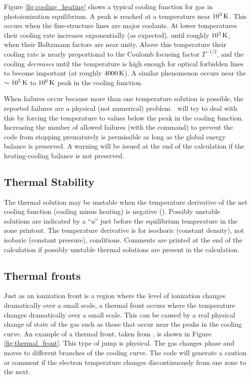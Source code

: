Figure \ref{fig:cooling_heating} shows a typical cooling function for
gas in photoionization equilibrium.
A peak is reached at a temperature near $10^3 {\rm\thinspace K}$.
This occurs
when the fine-structure lines are major coolants.
At lower temperatures
their cooling rate increases exponentially (as expected),
until roughly
$10^3 {\rm\thinspace K}$, when their Boltzmann factors are near unity.
Above this temperature
their cooling rate is nearly proportional to the Coulomb focusing factor
$T^{-1/2}$, and the cooling \emph{decreases} until the temperature
is high enough for
optical forbidden lines to become important (at roughly $4000 {\rm\thinspace K}$).
A similar
phenomenon occurs near the $\sim 10^5 {\rm\thinspace K}$ to $10^6 {\rm\thinspace K}$ peak in
the cooling function.

When failures occur because more than one temperature solution is
possible,  the reported failures are a physical (not numerical) problem.
\Cloudy\ will try to deal with this by forcing the temperature to
values below the peak in the cooling function.
Increasing the number of allowed failures
(with the  command) to prevent the code from
stopping prematurely
is permissible as long as the global energy balance is preserved.
A warning
will be issued at the end of the calculation if the heating-cooling balance
is not preserved.

\subsection{Thermal Stability}

The thermal solution may be unstable when the temperature derivative
of the net cooling function (cooling minus heating) is negative (\citealp{Field1965}).
Possibly unstable solutions are indicated by a ``u'' just before the
equilibrium temperature in the zone printout.  The temperature derivative
is for isochoric (constant density), not isobaric (constant pressure),
conditions.  Comments are printed at the end of the calculation if possibly
unstable thermal solutions are present in the calculation.

\subsection{Thermal fronts}

Just as an ionization front is a region where the level of ionization
changes dramatically over a small scale, a thermal front occurs where the
temperature changes dramatically over a small scale.  This can be caused
by a real physical change of state of the gas such as those that occur near
the peaks in the cooling curve.
An example of a thermal front, taken from
\citet{FerlandFabian2002}, is shown in Figure \ref{fig:thermal_front}.
This type of jump is physical.
The gas changes phase and moves to different branches
of the cooling curve.
The code will generate a caution or comment if the
electron temperature changes discontinuously from one zone to the next.

